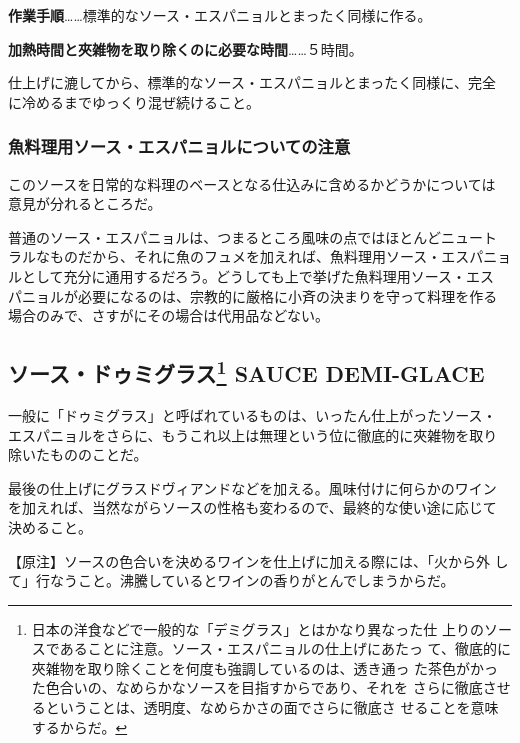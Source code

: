 \documentclass[twoside,12Q,b5paper]{escoffierltjsbook}
\begin{document}
\textbf{作業手順}\ldots{}\ldots{}標準的なソース・エスパニョルとまったく同様に作る。

\textbf{加熱時間と夾雑物を取り除くのに必要な時間}\ldots{}\ldots{}５時間。

仕上げに漉してから、標準的なソース・エスパニョルとまったく同様に、完全
に冷めるまでゆっくり混ぜ続けること。

\subsubsection{魚料理用ソース・エスパニョルについての注意}\label{ux9b5aux6599ux7406ux7528ux30bdux30fcux30b9ux30a8ux30b9ux30d1ux30cbux30e7ux30ebux306bux3064ux3044ux3066ux306eux6ce8ux610f}

このソースを日常的な料理のベースとなる仕込みに含めるかどうかについては
意見が分れるところだ。

普通のソース・エスパニョルは、つまるところ風味の点ではほとんどニュート
ラルなものだから、それに魚のフュメを加えれば、魚料理用ソース・エスパニョ
ルとして充分に通用するだろう。どうしても上で挙げた魚料理用ソース・エス
パニョルが必要になるのは、宗教的に厳格に小斉の決まりを守って料理を作る
場合のみで、さすがにその場合は代用品などない。

\subsection[ソース・ドゥミグラス SAUCE
DEMI-GLACE]{\texorpdfstring{ソース・ドゥミグラス\footnote{日本の洋食などで一般的な「デミグラス」とはかなり異なった仕
  上りのソースであることに注意。ソース・エスパニョルの仕上げにあたっ
  て、徹底的に夾雑物を取り除くことを何度も強調しているのは、透き通っ
  た茶色がかった色合いの、なめらかなソースを目指すからであり、それを
  さらに徹底させるということは、透明度、なめらかさの面でさらに徹底さ
  せることを意味するからだ。} SAUCE
DEMI-GLACE}{ソース・ドゥミグラス SAUCE DEMI-GLACE}}\label{ux30bdux30fcux30b9ux30c9ux30a5ux30dfux30b0ux30e9ux30b9102009-sauce-demi-glace}

一般に「ドゥミグラス」と呼ばれているものは、いったん仕上がったソース・
エスパニョルをさらに、もうこれ以上は無理という位に徹底的に夾雑物を取り
除いたもののことだ。

最後の仕上げにグラスドヴィアンドなどを加える。風味付けに何らかのワイン
を加えれば、当然ながらソースの性格も変わるので、最終的な使い途に応じて
決めること。

【原注】ソースの色合いを決めるワインを仕上げに加える際には、「火から外
して」行なうこと。沸騰しているとワインの香りがとんでしまうからだ。
\end{document}
